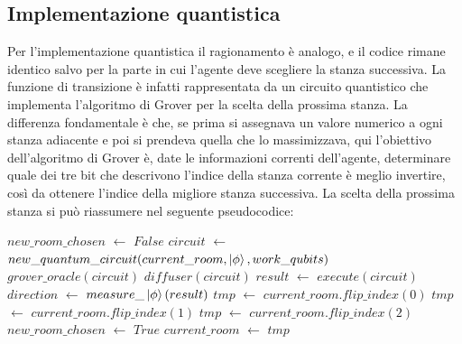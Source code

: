\documentclass{book}
\newcommand*\Let[2]{\State #1 $\gets$ #2}
\theoremstyle{definition}
\theoremstyle{definition}
\theoremstyle{definition}
\theoremstyle{plain}
\theoremstyle{plain}
\theoremstyle{plain}
\theoremstyle{plain}
\begin{document}
\subsection{Implementazione quantistica}

Per l'implementazione quantistica il ragionamento è analogo, e il codice rimane identico salvo per la parte in cui l'agente deve scegliere la stanza successiva. La funzione di transizione è infatti rappresentata da un circuito quantistico che implementa l'algoritmo di Grover per la scelta della prossima stanza. La differenza fondamentale è che, se prima si assegnava un valore numerico a ogni stanza adiacente e poi si prendeva quella che lo massimizzava, qui l'obiettivo dell'algoritmo di Grover è, date le informazioni correnti dell'agente, determinare quale dei tre bit che descrivono l'indice della stanza corrente è meglio invertire, così da ottenere l'indice della migliore stanza successiva. La scelta della prossima stanza si può riassumere nel seguente pseudocodice:

\begin{algorithm}[h]
\begin{algorithmic}[1]
    \Let{$new\_room\_chosen$}{$False$}
        \Let{$circuit$}{$new\_quantum\_circuit(current\_room, \ket{\phi}, work\_qubits)$}
        \State $grover\_oracle(circuit)$
        \State $diffuser(circuit)$
        \Let{$result$}{$execute(circuit)$}
        \Let{$direction$}{$measure\_\ket{\phi}(result)$}
            \Let{$tmp$}{$current\_room.flip\_index(0)$} 
        \EndIf
            \Let{$tmp$}{$current\_room.flip\_index(1)$} 
        \EndIf
            \Let{$tmp$}{$current\_room.flip\_index(2)$} 
        \EndIf
            \Let{$new\_room\_chosen$}{$True$}
            \Let{$current\_room$}{$tmp$}
        \EndIf
    \EndWhile
\EndProcedure
\end{algorithmic}
\end{algorithm}
\end{document}
